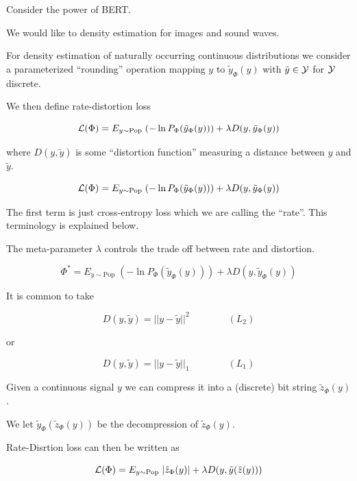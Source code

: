 {\vfill
Consider the power of BERT.

\vfill
We would like to density estimation for images and sound waves.

For density estimation of naturally occurring continuous distributions we consider
a parameterized ``rounding'' operation mapping $y$ to $\tilde{y}_\Phi(y)$ with $\tilde{y} \in {\cal Y}$ for ${\cal Y}$ discrete.

\vfill
We then define rate-distortion loss

\vfill
$${\cal L}(\Phi) = E_{y \sim \mathrm{Pop}}\;(- \ln P_\Phi(\tilde{y}_\Phi(y))) + \lambda D(y,\tilde{y}_\Phi(y))$$

\vfill
where $D(y,\tilde{y})$ is some ``distortion function'' measuring a distance between $y$ and $\tilde{y}$.


$${\cal L}(\Phi) = E_{y \sim \mathrm{Pop}}\;(- \ln P_\Phi(\tilde{y}_\Phi(y))) + \lambda D(y,\tilde{y}_\Phi(y))$$

\vfill
The first term is just cross-entropy loss which we are calling the ``rate''.  This terminology is explained below.

\vfill
The meta-parameter $\lambda$ controls the trade off between rate and distortion.



$$\Phi^* = E_{y \sim \mathrm{Pop}}\;(- \ln P_\Phi(\tilde{y}_\Phi(y))) + \lambda D(y,\tilde{y}_\Phi(y))$$

\vfill
It is common to take

$$D(y,\tilde{y}) = ||y-\tilde{y}||^2 \hspace{4em}(L_2)$$

\vfill
or

$$D(y,\tilde{y}) = ||y-\tilde{y}||_1 \hspace{4em} (L_1)$$


Given a continuous signal $y$ we can compress it into a (discrete) bit string $\tilde{z}_\Phi(y)$.

\vfill
We let $\tilde{y}_\Phi(\tilde{z}_\Phi(y))$ be the decompression of $\tilde{z}_\Phi(y)$.

\vfill
Rate-Disrtion loss can then be written as

$${\cal L}(\Phi) = E_{y \sim \mathrm{Pop}}\;|\tilde{z}_\Phi(y)| + \lambda D(y,\tilde{y}(\tilde{z}(y)))$$

}
